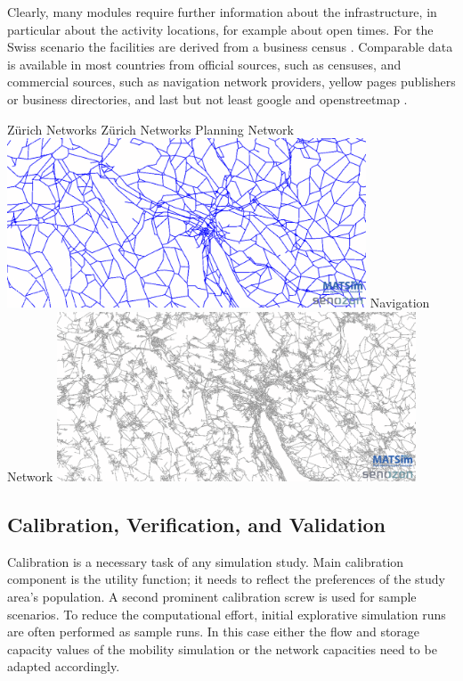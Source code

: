 Clearly, many modules require further information about the infrastructure, in particular about the activity locations, for example about open times. For the Swiss scenario the facilities are derived from a business census \citep[][]{}. Comparable data is available in most countries from official sources, such as censuses, and commercial sources, such as navigation network providers, yellow pages publishers or business directories, and last but not least google and openstreetmap \citep[][]{OpenStreetMap_Webpage_2015}.

\createfigure%
{Zürich Networks}%
{Zürich Networks}%
{\label{fig:zhnetwork}}%
{%
  \createsubfigure%
  {Planning Network}%
  {\includegraphics[width=0.8\textwidth,angle=0]{using/figures/planning.png}}%
  {\label{fig:planningnetwork}}%
  {}%
  \createsubfigure%
  {Navigation Network}%
	{\includegraphics[width=0.8\textwidth,angle=0]{using/figures/navigation.png}}%
  {\label{fig:navigationnetwork}}%
  {}%
}%
{}

\subsection{Calibration, Verification, and Validation}
Calibration is a necessary task of any simulation study. Main calibration component is the utility function; it needs to reflect the preferences of the study area's population. A second prominent calibration screw is used for sample scenarios. To reduce the computational effort, initial explorative simulation runs are often performed as sample runs. In this case either the flow and storage capacity values of the mobility simulation or the network capacities need to be adapted accordingly.

